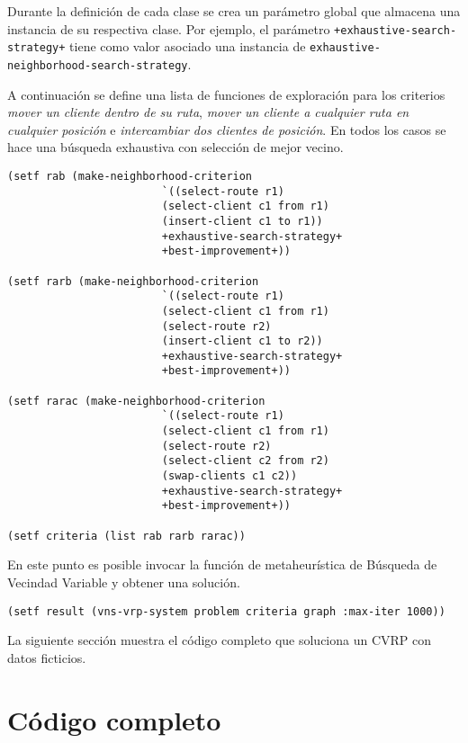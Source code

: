 Durante la definición de cada clase se crea un parámetro global que almacena una instancia de su respectiva clase. Por ejemplo, el parámetro \texttt{+exhaustive-search-strategy+} tiene como valor asociado una instancia de \texttt{exhaustive-neighborhood-search-strategy}.

A continuación se define una lista de funciones de exploración para los criterios \textit{mover un cliente dentro de su ruta}, \textit{mover un cliente a cualquier ruta en cualquier posición} e \textit{intercambiar dos clientes de posición}. En todos los casos se hace una búsqueda exhaustiva con selección de mejor vecino.

\begin{lstlisting}
(setf rab (make-neighborhood-criterion 
						`((select-route r1)
						(select-client c1 from r1)
						(insert-client c1 to r1))
						+exhaustive-search-strategy+ 
						+best-improvement+))

(setf rarb (make-neighborhood-criterion 
						`((select-route r1)
						(select-client c1 from r1)
						(select-route r2)
						(insert-client c1 to r2))
						+exhaustive-search-strategy+ 
						+best-improvement+))

(setf rarac (make-neighborhood-criterion 
						`((select-route r1)
						(select-client c1 from r1)
						(select-route r2)
						(select-client c2 from r2)
						(swap-clients c1 c2))
						+exhaustive-search-strategy+ 
						+best-improvement+))

(setf criteria (list rab rarb rarac))

\end{lstlisting}

En este punto es posible invocar la función de metaheurística de Búsqueda de Vecindad Variable y obtener una solución.

\begin{lstlisting}
(setf result (vns-vrp-system problem criteria graph :max-iter 1000))
\end{lstlisting}

La siguiente sección muestra el código completo que soluciona un CVRP con datos ficticios.

\section{Código completo}\label{4-union}

